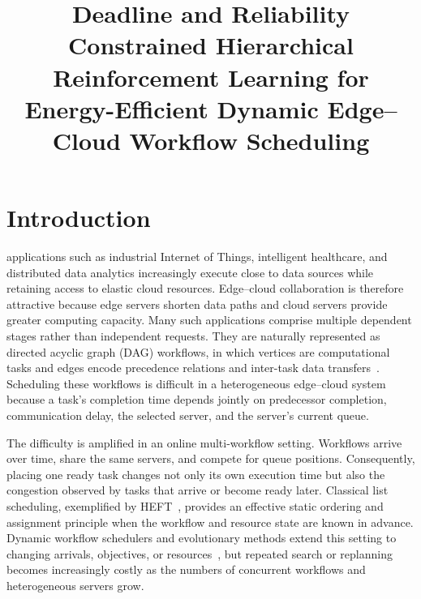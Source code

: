 \documentclass[lettersize,journal]{IEEEtran}
\begin{document}
\title{Deadline and Reliability Constrained Hierarchical Reinforcement Learning
for Energy-Efficient Dynamic Edge--Cloud Workflow Scheduling}

\author{%
}


\maketitle

\begin{abstract}
\end{abstract}

\begin{IEEEkeywords}
\end{IEEEkeywords}

\section{Introduction}
\label{sec:introduction}

 applications such as industrial Internet of Things, intelligent
healthcare, and distributed data analytics increasingly execute close to data
sources while retaining access to elastic cloud resources. Edge--cloud
collaboration is therefore attractive because edge servers shorten data paths
and cloud servers provide greater computing capacity. Many such applications
comprise multiple dependent stages rather than independent requests. They are
naturally represented as directed acyclic graph (DAG) workflows, in which
vertices are computational tasks and edges encode precedence relations and
inter-task data transfers~\cite{topcuoglu2002,jayanetti2022}. Scheduling these
workflows is difficult in a heterogeneous edge--cloud system because a task's
completion time depends jointly on predecessor completion, communication
delay, the selected server, and the server's current queue.

The difficulty is amplified in an online multi-workflow setting. Workflows
arrive over time, share the same servers, and compete for queue positions.
Consequently, placing one ready task changes not only its own execution time
but also the congestion observed by tasks that arrive or become ready later.
Classical list scheduling, exemplified by HEFT~\cite{topcuoglu2002}, provides
an effective static ordering and assignment principle when the workflow and
resource state are known in advance. Dynamic workflow schedulers and
evolutionary methods extend this setting to changing arrivals, objectives, or
resources~\cite{arabnejad2019,ismayilov2020}, but repeated search or
replanning becomes increasingly costly as the numbers of concurrent workflows
and heterogeneous servers grow.
\end{document}
